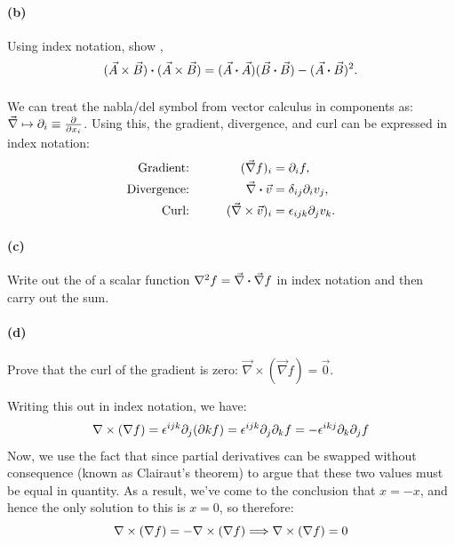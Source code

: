 \documentclass{article}
\begin{document}
\paragraph{(b)}		\extrapart
Using index notation, show ,
	\begin{equation*}
		(\vec{A}\times\vec{B})\boldsymbol{\cdot}(\vec{A}\times\vec{B}) = (\vec{A}\boldsymbol{\cdot}\vec{A})(\vec{B}\boldsymbol{\cdot}\vec{B}) - (\vec{A}\boldsymbol{\cdot}\vec{B})^{2}.
	\end{equation*}


\phline
\paragraph{}
We can treat the nabla/del symbol from vector calculus in components as: $\vec{\nabla} \mapsto \partial_{i}\equiv \frac{\partial{}}{\partial{x_{i}}}$.
Using this, the gradient, divergence, and curl can be expressed in index notation:
	\begin{alignat*}{3}
		\textrm{Gradient:}&\qquad& 
			(\vec{\nabla}f)_{i} &= \partial_{i}f, \\
		\textrm{Divergence:}&\qquad&
			\vec{\nabla}\boldsymbol{\cdot}\vec{v} &= \delta_{ij}\partial_{i}v_{j}, \\
		\textrm{Curl:}&\qquad&
			(\vec{\nabla}\times\vec{v})_{i} &= \epsilon_{ijk}\partial_{j}v_{k}. 
	\end{alignat*}

\paragraph{(c)}		\extrapart
Write out the  of a scalar function $\nabla^{2}f = \vec{\nabla}\boldsymbol{\cdot}\vec{\nabla}f$ in index notation and then carry out the sum.



\paragraph{(d)}
Prove that the curl of the gradient is zero: $\vec{\nabla}\times(\vec{\nabla}f) = \vec{0}$.

\begin{solution}
    Writing this out in index notation, we have:
    \[ \nabla \times (\nabla f) = \epsilon^{ijk} \partial_j (\partial k f) = \epsilon^{ijk}\partial_j \partial_k f = -\epsilon^{ikj}\partial_k \partial_j f\]
    Now, we use the fact that since partial derivatives can be swapped without consequence (known as Clairaut's theorem) to argue that these two values must be equal in quantity. As a result, we've come to the conclusion that $x = -x$, and hence the only solution to this is $x = 0$, so therefore:
    \[ \nabla \times(\nabla f) = -\nabla \times(\nabla f) \Longrightarrow \nabla \times(\nabla f) = 0\]
\end{solution}
\end{document}
